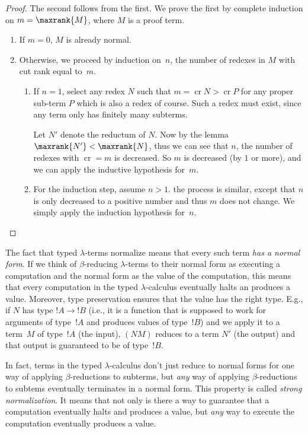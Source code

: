 \documentclass[10pt,a4paper]{article}
\theoremstyle{plain}
\theoremstyle{definition}
\theoremstyle{remark}
\providecommand{\lif}{\mathbin{\rightarrow}}
\providecommand{\lambd}{\ensuremath{\lambda}}
\providecommand{\cutrank}{\operatorname{cr}}
\providecommand{\cutrank}{\operatorname{cr}}
\begin{document}
\begin{proof}
  The second follows from the first. We prove the first by complete
  induction on $m=\maxrank{M}$, where $M$ is a proof term.
  \begin{enumerate}

  \item If $m=0$, $M$ is already normal.
  \item
    Otherwise, we proceed by induction on~$n$, the number of
    redexes in $M$ with cut rank equal to~$m$.
    \begin{enumerate}
    \item If $n=1$, select any redex $N$ such that $m = \cutrank{N} >
      \cutrank{P}$ for any proper sub-term $P$ which is also a redex
      of course. Such a redex must exist, since any term only has
      finitely many subterms.

      Let $N'$ denote the reductum of $N$. Now by the lemma
      $\maxrank{N'} < \maxrank{N}$, thus we can see that $n$, the
      number of redexes with $\cutrank=m$ is decreased. So $m$ is
      decreased (by $1$ or more), and we can apply the inductive
      hypothesis for~$m$.
    \item For the induction step, assume $n>1$. the process is
      similar, except that $n$ is only decreased to a positive number
      and thus $m$ does not change. We simply apply the induction
      hypothesis for~$n$.
    \end{enumerate}
\end{enumerate}
\end{proof}

The fact that typed $\lambd$-terms normalize means that every such
term \emph{has a normal form}. If we think of $\beta$-reducing
$\lambd$-terms to their normal form as executing a computation and the
normal form as the value of the computation, this means that every
computation in the typed $\lambd$-calculus eventually halts an
produces a value. Moreover, type preservation ensures that the value
has the right type. E.g., if $N$ has type $!A \lif !B$ (i.e., it is a
function that is supposed to work for arguments of type~$!A$ and
produces values of type~$!B$) and we apply it to a term~$M$ of type~$!A$
(the input), $(NM)$ reduces to a term $N'$ (the output) and that
output is guaranteed to be of type~$!B$.

In fact, terms in the typed $\lambd$-calculus don't just reduce to
normal forms for one way of applying $\beta$-reductions to subterms,
but \emph{any} way of applying $\beta$-reductions to subtems
eventually terminates in a normal form. This property is called
\emph{strong normalization}. It means that not only is there a way to
guarantee that a computation eventually halts and produces a value,
but \emph{any} way to execute the computation eventually produces a
value.
\end{document}
